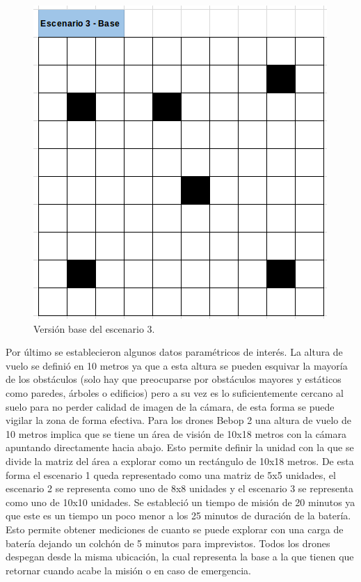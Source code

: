 \begin{figure}[h!]
	\label{fig:comp}
	\includegraphics[width=.8\textwidth]{imagenes/chap6/image3}
	\caption{Versión base del escenario 3.}
\end{figure}

Por último se establecieron algunos datos paramétricos de interés.
La altura de vuelo se definió en 10 metros ya que a esta altura se pueden esquivar la mayoría de los obstáculos (solo hay que preocuparse por obstáculos mayores y estáticos como paredes, árboles o edificios) pero a su vez es lo suficientemente cercano al suelo para no perder calidad de imagen de la cámara, de esta forma se puede vigilar la zona de forma efectiva.
Para los drones Bebop 2 una altura de vuelo de 10 metros implica que se tiene un área de visión de 10x18 metros con la cámara apuntando directamente hacia abajo. Esto permite definir la unidad con la que se divide la matriz del área a explorar como un rectángulo de 10x18 metros. De esta forma el escenario 1 queda representado como una matriz de 5x5 unidades, el escenario 2 se representa como uno de 8x8 unidades y el escenario 3 se representa como uno de 10x10 unidades.
Se estableció un tiempo de misión de 20 minutos ya que este es un tiempo un poco menor a los 25 minutos de duración de la batería. Esto permite obtener mediciones de cuanto se puede explorar con una carga de batería dejando un colchón de 5 minutos para imprevistos.
Todos los drones despegan desde la misma ubicación, la cual representa la base a la que tienen que retornar cuando acabe la misión o en caso de emergencia.

